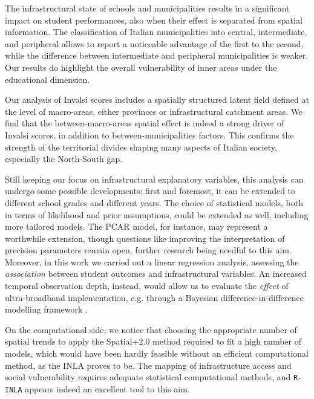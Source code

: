 \documentclass[openany, 11pt, oneside]{book}
\begin{document}
The infrastructural state of schools and municipalities results in a significant impact on student performances, also when their effect is separated from spatial information. The classification of Italian municipalities into central, intermediate, and peripheral allows to report a noticeable advantage of the first to the second, while the difference between intermediate and peripheral municipalities is weaker. Our results do highlight the overall vulnerability of inner areas under the educational dimension.

Our analysis of Invalsi scores includes a spatially structured latent field defined at the level of macro-areas, either provinces or infrastructural catchment areas. We find that the between-macro-areas spatial effect is indeed a strong driver of Invalsi scores, in addition to between-municipalities factors. This confirms the strength of the territorial divides shaping many aspects of Italian society, especially the North-South gap.

Still keeping our focus on infrastructural explanatory variables, this analysis can undergo some possible developments: first and foremost, it can be extended to different school grades and different years. The choice of statistical models, both in terms of likelihood and prior assumptions, could be extended as well, including more tailored models. The PCAR model, for instance, may represent a worthwhile extension, though questions like improving the interpretation of precision parameters remain open, further research being needful to this aim. Moreover, in this work we carried out a linear regression analysis, assessing the \textit{association} between student outcomes and infrastructural variables. An increased temporal observation depth, instead, would allow us to evaluate the \textit{effect} of ultra-broadband implementation, e.g. through a Bayesian difference-in-difference modelling framework \parencite{Bonader_DiD}.

On the computational side, we notice that choosing the appropriate number of spatial trends to apply the Spatial+2.0 method required to fit a high number of models, which would have been hardly feasible without an efficient computational method, as the INLA proves to be. The mapping of infrastructure access and social vulnerability requires adequate statistical computational methods, and \texttt{R-INLA} appears indeed an excellent tool to this aim. 
\end{document}
